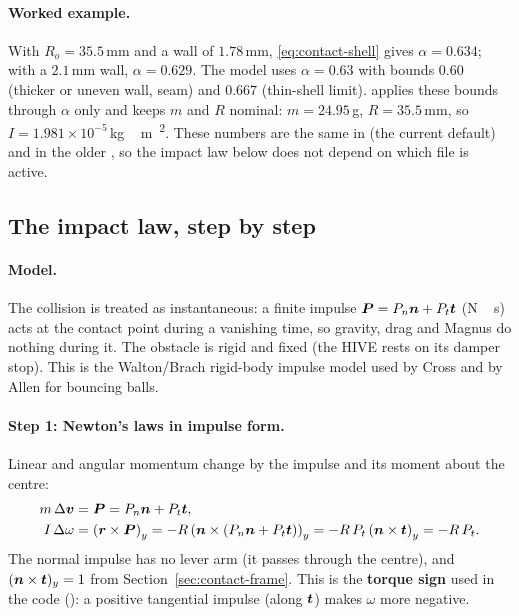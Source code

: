 \paragraph{Worked example.}
With $R_o=35.5$\,\unit{mm}\confirmed{} and a wall of $1.78$\,\unit{mm}\assumed{},
\eqref{eq:contact-shell} gives $\alpha=0.634$\derived; with a $2.1$\,\unit{mm}\assumed{} wall,
$\alpha=0.629$\derived. The model uses $\alpha=0.63$\derived{} with bounds
$0.60$\assumed{} (thicker or uneven wall, seam) and $0.667$\derived{} (thin-shell limit).
 applies these bounds through $\alpha$ only and keeps $m$ and $R$ nominal:
$m=24.95$\,\unit{g}\assumed{}, $R=35.5$\,\unit{mm}\confirmed{}, so
$I=1.981\times10^{-5}$\,\unit{kg\,m\textsuperscript{2}}\derived.
These numbers are the same in  (the current default) and in the
older , so the impact law below does not depend on which file is
active.

\subsection{The impact law, step by step}
\label{sec:contact-law}

\paragraph{Model.}
The collision is treated as instantaneous: a finite impulse
$\bm{P}=P_n\bm{n}+P_t\bm{t}$ (\unit{N\,s}) acts at the contact point during a vanishing
time, so gravity, drag and Magnus do nothing during it. The obstacle is rigid and fixed (the
HIVE rests on its damper stop). This is the Walton/Brach rigid-body impulse model used by Cross
and by Allen for bouncing balls.

\paragraph{Step 1: Newton's laws in impulse form.}
Linear and angular momentum change by the impulse and its moment about the centre:
\begin{align}
  m\,\Delta\bm{v} &= \bm{P} = P_n\bm{n} + P_t\bm{t},
  \label{eq:contact-newton-lin}\\
  I\,\Delta\omega &= \left(\bm{r}\times\bm{P}\right)_y
  = -R\left(\bm{n}\times(P_n\bm{n}+P_t\bm{t})\right)_y
  = -R\,P_t\left(\bm{n}\times\bm{t}\right)_y
  = -R\,P_t .
  \label{eq:contact-newton-ang}
\end{align}
The normal impulse has no lever arm (it passes through the centre), and
$(\bm{n}\times\bm{t})_y=1$ from Section~\ref{sec:contact-frame}. This is the \textbf{torque
sign} used in the code (): a positive tangential impulse (along
$\bm{t}$) makes $\omega$ more negative.

